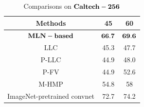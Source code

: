 \documentclass[journal]{IEEEtran}
\begin{document}
\begin{table}[!t]
\caption{Comparisons on $\bf{Caltech-256}$}
\begin{center}
\begin{tabular}{|c|c|c|}
\hline
Methods & 45 & 60 \\
\hline
$\bf{MLN-based}$ & $\bf{66.7}$ & $\bf{69.6}$ \\
\hline
LLC &  45.3 & 47.7\\
\hline
P-LLC & 44.9 & 48.0\\
\hline
P-FV & 44.9 & 52.6\\
\hline
M-HMP & 54.8 & 58 \\
\hline
ImageNet-pretrained convnet & 72.7 & 74.2 \\
\hline
\end{tabular}
\end{center}
\end{table}
\end{document}
